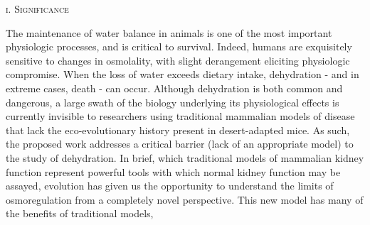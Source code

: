 \documentclass[11pt]{article}
\begin{document}
\setlength{\parindent}{1cm}
\setcounter{page}{0}

\pagestyle{fancy}



%
%

\setcounter{page}{1}
\normalsize 
\begin{center}
\textsc{{i. Significance}} \\
\end{center}

The maintenance of water balance in animals is one of the most important physiologic processes, and is critical to survival. Indeed, humans are exquisitely sensitive to changes in osmolality, with slight derangement eliciting physiologic compromise. When the loss of water exceeds dietary intake, dehydration - and in extreme cases, death - can occur. Although dehydration is both common and dangerous, a large swath of the biology underlying its physiological effects is currently invisible to researchers using traditional mammalian models of disease that lack the eco-evolutionary history present in desert-adapted mice. As such, the proposed work addresses a critical barrier (lack of an appropriate model) to the study of dehydration. In brief, which traditional models of mammalian kidney function represent powerful tools with which normal kidney function may be assayed, evolution has given us the opportunity to understand the limits of osmoregulation from a completely novel perspective. This new model has many of the benefits of traditional models,  
\end{document}
